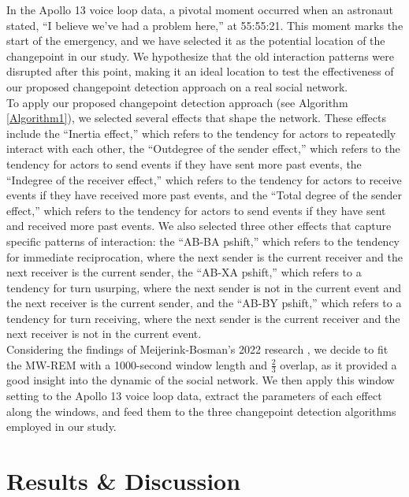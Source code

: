 \documentclass[]{interact}
\theoremstyle{plain}%
\theoremstyle{definition}
\theoremstyle{remark}
\begin{document}
{	In the Apollo 13 voice loop data, a pivotal moment occurred when an astronaut stated, ``I believe we've had a problem here,'' at 55:55:21. This moment marks the start of the emergency, and we have selected it as the potential location of the changepoint in our study. We hypothesize that the old interaction patterns were disrupted after this point, making it an ideal location to test the effectiveness of our proposed changepoint detection approach on a real social network. \\
	
	To apply our proposed changepoint detection approach (see Algorithm \autoref{Algorithm1}), we selected several effects that shape the network. These effects include the ``Inertia effect,'' which refers to the tendency for actors to repeatedly interact with each other, the ``Outdegree of the sender effect,'' which refers to the tendency for actors to send events if they have sent more past events, the ``Indegree of the receiver effect,'' which refers to the tendency for actors to receive events if they have received more past events, and the ``Total degree of the sender effect,'' which refers to the tendency for actors to send events if they have sent and received more past events. We also selected three other effects that capture specific patterns of interaction: the ``AB-BA pshift,'' which refers to the tendency for immediate reciprocation, where the next sender is the current receiver and the next receiver is the current sender, the ``AB-XA pshift,'' which refers to a tendency for turn usurping, where the next sender is not in the current event and the next receiver is the current sender, and the ``AB-BY pshift,'' which refers to a tendency for turn receiving, where the next sender is the current receiver and the next receiver is not in the current event. \\ %
	
	Considering the findings of Meijerink-Bosman's 2022 research \cite{meijerink-bosmanDynamicRelationalEvent2022}, we decide to fit the MW-REM with a 1000-second window length and $\frac{2}{3}$ overlap, as it provided a good insight into the dynamic of the social network. We then apply this window setting to the Apollo 13 voice loop data, extract the parameters of each effect along the windows, and feed them to the three changepoint detection algorithms employed in our study.
	
	\section{\fontsize{14}{15}\selectfont Results \& Discussion} \label{sec:results}
	
}
\end{document}
